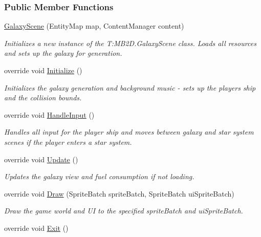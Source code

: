 \subsubsection*{Public Member Functions}
\begin{DoxyCompactItemize}
\item 
\hyperlink{class_midnight_blue_1_1_galaxy_scene_acdd82e3464ea18ca77bcf4694e9803a5}{Galaxy\+Scene} (Entity\+Map map, Content\+Manager content)
\begin{DoxyCompactList}\small\item\em Initializes a new instance of the T\+:\+M\+B2\+D.\+Galaxy\+Scene class. Loads all resources and sets up the galaxy for generation. \end{DoxyCompactList}\item 
override void \hyperlink{class_midnight_blue_1_1_galaxy_scene_a97d97e56a73d9a4b7caf6dd6ce86647e}{Initialize} ()
\begin{DoxyCompactList}\small\item\em Initializes the galaxy generation and background music -\/ sets up the players ship and the collision bounds. \end{DoxyCompactList}\item 
override void \hyperlink{class_midnight_blue_1_1_galaxy_scene_afd7f8c9f6d0cf6ded10299d4b0015c29}{Handle\+Input} ()
\begin{DoxyCompactList}\small\item\em Handles all input for the player ship and moves between galaxy and star system scenes if the player enters a star system. \end{DoxyCompactList}\item 
override void \hyperlink{class_midnight_blue_1_1_galaxy_scene_a9dfa66406143ed20f4d534c768f05a78}{Update} ()
\begin{DoxyCompactList}\small\item\em Updates the galaxy view and fuel consumption if not loading. \end{DoxyCompactList}\item 
override void \hyperlink{class_midnight_blue_1_1_galaxy_scene_a3646fcf97e067bac267d42aad66e71c4}{Draw} (Sprite\+Batch sprite\+Batch, Sprite\+Batch ui\+Sprite\+Batch)
\begin{DoxyCompactList}\small\item\em Draw the game world and UI to the specified sprite\+Batch and ui\+Sprite\+Batch. \end{DoxyCompactList}\item 
override void \hyperlink{class_midnight_blue_1_1_galaxy_scene_a7a96978e050da997330bcc0f3cd00f9e}{Exit} ()

\end{DoxyCompactItemize}

